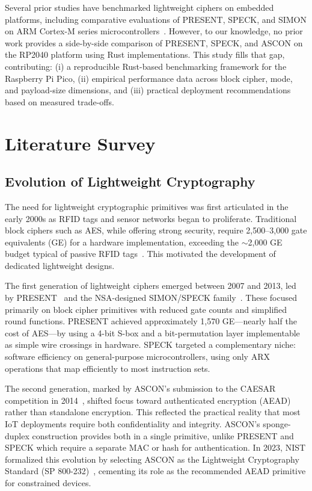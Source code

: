 \documentclass[12pt]{report}
\begin{document}
Several prior studies have benchmarked lightweight ciphers on embedded platforms, including
comparative evaluations of PRESENT, SPECK, and SIMON on ARM Cortex-M series
microcontrollers~\cite{beaulieu2015simon,mckay2017nist}. However, to our knowledge,
no prior work provides a side-by-side comparison of PRESENT, SPECK, and ASCON on the
RP2040 platform using Rust implementations. This study fills that gap, contributing:
(i) a reproducible Rust-based benchmarking framework for the Raspberry Pi Pico,
(ii) empirical performance data across block cipher, mode, and payload-size dimensions,
and (iii) practical deployment recommendations based on measured trade-offs.

\chapter{Literature Survey}

\section{Evolution of Lightweight Cryptography}

The need for lightweight cryptographic primitives was first articulated in
the early 2000s as RFID tags and sensor networks began to proliferate.
Traditional block ciphers such as AES, while offering strong security,
require 2,500--3,000 gate equivalents (GE) for a hardware implementation,
exceeding the $\sim$2,000 GE budget typical of passive RFID tags~\cite{mckay2017nist}.
This motivated the development of dedicated lightweight designs.

The first generation of lightweight ciphers emerged between 2007 and 2013,
led by PRESENT~\cite{bogdanov2007present} and the NSA-designed SIMON/SPECK
family~\cite{beaulieu2015simon}. These focused primarily on block cipher
primitives with reduced gate counts and simplified round functions.
PRESENT achieved approximately 1,570 GE---nearly half the cost of AES---by
using a 4-bit S-box and a bit-permutation layer implementable as simple
wire crossings in hardware. SPECK targeted a complementary niche: software
efficiency on general-purpose microcontrollers, using only ARX operations
that map efficiently to most instruction sets.

The second generation, marked by ASCON's submission to the CAESAR
competition in 2014~\cite{dobraunig2016ascon}, shifted focus toward
authenticated encryption (AEAD) rather than standalone encryption.
This reflected the practical reality that most IoT deployments require
both confidentiality and integrity. ASCON's sponge-duplex construction
provides both in a single primitive, unlike PRESENT and SPECK which
require a separate MAC or hash for authentication. In 2023, NIST
formalized this evolution by selecting ASCON as the Lightweight
Cryptography Standard (SP 800-232)~\cite{nist2025ascon}, cementing
its role as the recommended AEAD primitive for constrained devices.
\end{document}
